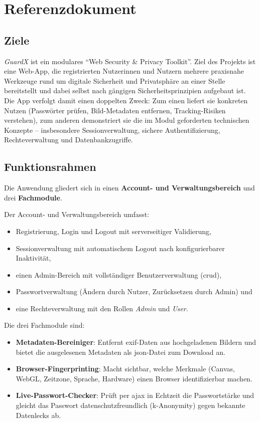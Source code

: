 \chapter{Referenzdokument}
\label{ch:a-referenz}

\section{Ziele}
\emph{GuardX} ist ein modulares \enquote{Web Security \& Privacy Toolkit}. Ziel des Projekts ist
eine Web-App, die registrierten Nutzerinnen und Nutzern mehrere praxisnahe Werkzeuge rund um
digitale Sicherheit und Privatsph\"are an einer Stelle bereitstellt und dabei selbst nach
g\"angigen Sicherheitsprinzipien aufgebaut ist. Die App verfolgt damit einen doppelten Zweck:
Zum einen liefert sie konkreten Nutzen (Passw\"orter pr\"ufen, Bild-Metadaten entfernen,
Tracking-Risiken verstehen), zum anderen demonstriert sie die im Modul geforderten technischen
Konzepte -- insbesondere Sessionverwaltung, sichere Authentifizierung, Rechteverwaltung und
Datenbankzugriffe.

\section{Funktionsrahmen}
Die Anwendung gliedert sich in einen \textbf{Account- und Verwaltungsbereich} und drei
\textbf{Fachmodule}.

Der Account- und Verwaltungsbereich umfasst:
\begin{itemize}
  \item Registrierung, Login und Logout mit serverseitiger Validierung,
  \item Sessionverwaltung mit automatischem Logout nach konfigurierbarer Inaktivit\"at,
  \item einen Admin-Bereich mit vollst\"andiger Benutzerverwaltung (\ac{crud}),
  \item Passwortverwaltung (\"Andern durch Nutzer, Zur\"ucksetzen durch Admin) und
  \item eine Rechteverwaltung mit den Rollen \emph{Admin} und \emph{User}.
\end{itemize}

Die drei Fachmodule sind:
\begin{itemize}
  \item \textbf{Metadaten-Bereiniger}: Entfernt \ac{exif}-Daten aus hochgeladenen Bildern und
        bietet die ausgelesenen Metadaten als \ac{json}-Datei zum Download an.
  \item \textbf{Browser-Fingerprinting}: Macht sichtbar, welche Merkmale (Canvas, WebGL,
        Zeitzone, Sprache, Hardware) einen Browser identifizierbar machen.
  \item \textbf{Live-Passwort-Checker}: Pr\"uft per \ac{ajax} in Echtzeit die Passwortst\"arke und
        gleicht das Passwort datenschutzfreundlich (k-Anonymity) gegen bekannte Datenlecks ab.
\end{itemize}

